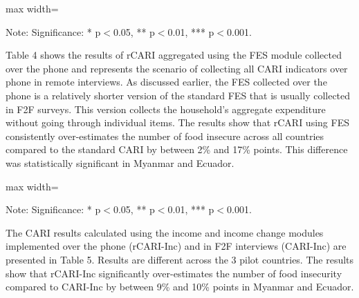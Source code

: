 \documentclass[11pt,harvard]{article}
\begin{document}
\begin{table}[htbp]
	\centering
	\begin{adjustbox}{max width=\textwidth}
		\begin{threeparttable}
			\caption{Impact of Survey Modality: CARI-FES vs. rCARI-FES}
			\scriptsize
			 
			\label{tab:CARI_FES_rCARI_Modality_All_Country}
			\begin{tablenotes}
				\item Note: Significance: * p$<$0.05, ** p$<$0.01, *** p$<$0.001. 
			\end{tablenotes}
		\end{threeparttable}
	\end{adjustbox}
\end{table}

Table 4 shows the results of rCARI aggregated using the FES module collected over the phone and represents the scenario of collecting all CARI indicators over phone in remote interviews. As discussed earlier, the FES collected over the phone is a relatively shorter version of the standard FES that is usually collected in F2F surveys. This version collects the household's aggregate expenditure without going through individual items. 
The results show that rCARI using FES consistently over-estimates the number of food insecure across all countries compared to the standard CARI by between 2\% and 17\% points. This difference was statistically significant in Myanmar and Ecuador.

\begin{table}[htbp]
	\centering
	\begin{adjustbox}{max width=\textwidth}
		\begin{threeparttable}
			\caption{Impact of Survey Modality: CARI-Inc vs. rCARI-Inc}
			\scriptsize
			 
			\label{tab:Inc_CARI_rCARI_Modality_All_Country}
			\begin{tablenotes}
				\item Note: Significance: * p$<$0.05, ** p$<$0.01, *** p$<$0.001. 
			\end{tablenotes}
		\end{threeparttable}
	\end{adjustbox}
\end{table}

The CARI results calculated using the income and income change modules implemented over the phone (rCARI-Inc) and in F2F interviews (CARI-Inc) are presented in Table 5. Results are different across the 3 pilot countries. The results show that rCARI-Inc significantly over-estimates the number of food insecurity compared to CARI-Inc by between 9\% and 10\% points in Myanmar and Ecuador. 
\end{document}
